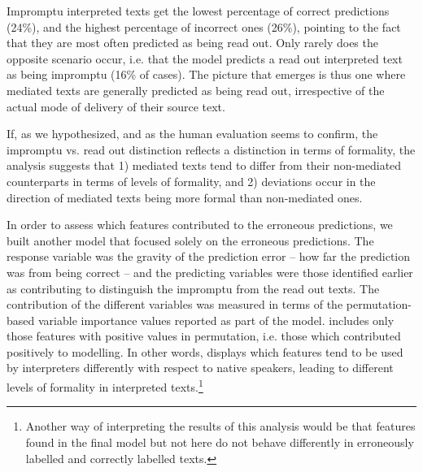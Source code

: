 \documentclass[output=paper]{langscibook}
\begin{document}
Impromptu interpreted texts get the lowest percentage of correct predictions (24\%), and the highest percentage of incorrect ones (26\%), pointing to the fact that they are most often predicted as being read out. Only rarely does the opposite scenario occur, i.e. that the model predicts a read out interpreted text as being impromptu (16\% of cases). The picture that emerges is thus one where mediated texts are generally predicted as being read out, irrespective of the actual mode of delivery of their source text. 

If, as we hypothesized, and as the human evaluation seems to confirm, the impromptu vs. read out distinction reflects a distinction in terms of formality, the analysis suggests that 1) mediated texts tend to differ from their non-mediated counterparts in terms of levels of formality, and 2) deviations occur in the direction of mediated texts being more formal than non-mediated ones.

In order to assess which features contributed to the erroneous predictions, we built another model that focused solely on the erroneous predictions. The response variable was the gravity of the prediction error – how far the prediction was from being correct – and the predicting variables were those identified earlier as contributing to distinguish the impromptu from the read out texts. The contribution of the different variables was measured in terms of the permutation-based variable importance values reported as part of the model.  includes only those features with positive values in permutation, i.e. those which contributed positively to modelling. In other words,  displays which features tend to be used by interpreters differently with respect to native speakers, leading to different levels of formality in interpreted texts.\footnote{Another way of interpreting the results of this analysis would be that features found in the final model but not here do not behave differently in erroneously labelled and correctly labelled texts.}
\end{document}
